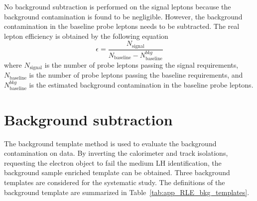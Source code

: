 No background subtraction is performed on the signal leptons because the background contamination is found to be negligible.
However, the background contamination in the baseline probe leptons needs to be subtracted.
The real lepton efficiency is obtained by the following equation
%
\begin{equation}
    \epsilon = \frac{N_{\mathrm{signal}}}{N_{\mathrm{baseline}} - N_{\mathrm{baseline}}^{bkg}}
    \label{eq:app_RLE_efficiency_formula}
\end{equation}
%
where $N_\mathrm{signal}$ is the number of probe leptons passing the signal requirements, $N_\mathrm{baseline}$ is the number of probe leptons passing the baseline requirements, and $N_\mathrm{baseline}^{bkg}$ is the estimated background contamination in the baseline probe leptons.


\section{Background subtraction}
\label{sec:app_RLE_bkg_subtraction}
The background template method is used to evaluate the background contamination on data.
By inverting the calorimeter and track isolations, requesting the electron object to fail the medium LH identification, the background sample enriched template can be obtained.
Three background templates are considered for the systematic study.
The definitions of the background template are summarized in Table~\ref{tab:app_RLE_bkg_templates}.

\begin{table}[ht]
    \caption{The definition of the background templates for estimating the background contamination associated with the $Z$ tag-and-probe method.
    The baseline template is used to estimate the background contamination.
    The variation 1 template has looser requirements and the variation 2 template has tighter requirements.
    They are used to assess the systematic caused by the background contamination.}
    \label{tab:app_RLE_bkg_templates}
\end{table}

